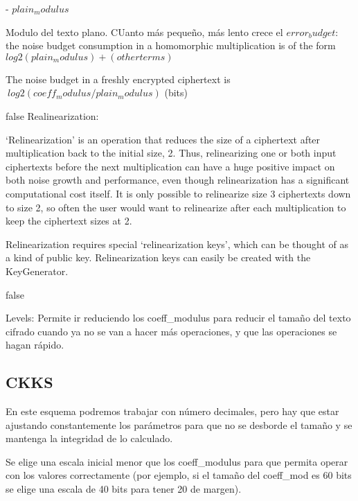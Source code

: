 - $plain_modulus$

Modulo del texto plano. CUanto más pequeño, más lento crece el $error_budget$: the noise budget consumption in a homomorphic multiplication is of the form $log2(plain_modulus) + (other terms)$

The noise budget in a freshly encrypted ciphertext is $~ log2(coeff_modulus/plain_modulus)$  (bits)


\if false
Realinearization:

`Relinearization' is an operation that reduces the size of a ciphertext after
    multiplication back to the initial size, 2. Thus, relinearizing one or both
    input ciphertexts before the next multiplication can have a huge positive
    impact on both noise growth and performance, even though relinearization has
    a significant computational cost itself. It is only possible to relinearize
    size 3 ciphertexts down to size 2, so often the user would want to relinearize
    after each multiplication to keep the ciphertext sizes at 2.

    Relinearization requires special `relinearization keys', which can be thought
    of as a kind of public key. Relinearization keys can easily be created with
    the KeyGenerator.

\fi

\if false

Levels: Permite ir reduciendo los coeff\_modulus para reducir el tamaño del texto cifrado cuando ya no se van a hacer más operaciones, y que las operaciones se hagan rápido.

\fi

\subsection{CKKS}

En este esquema podremos trabajar con número decimales, pero hay que estar ajustando constantemente los parámetros para que no se desborde el tamaño y se mantenga la integridad de lo calculado.

Se elige una escala inicial menor que los coeff\_modulus para que permita operar con los valores correctamente (por ejemplo, si el tamaño del coeff\_mod es 60 bits se elige una escala de 40 bits para tener 20 de margen).


